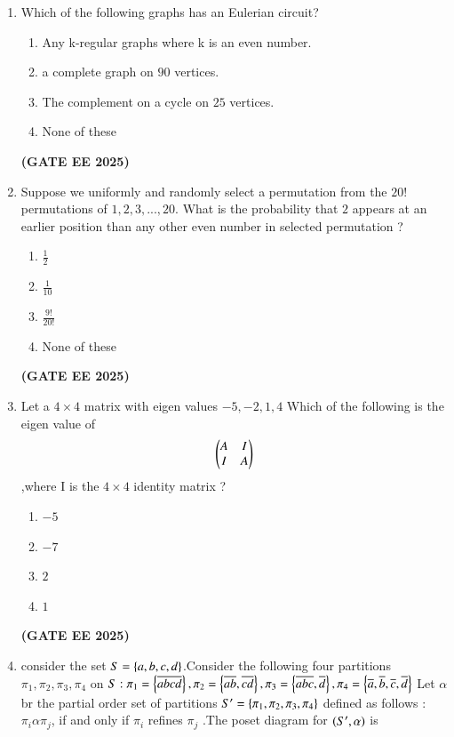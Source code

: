 \documentclass[journal,12pt,onecolumn]{IEEEtran}
\theoremstyle{remark}
\begin{document}
\begin {center}
\begin{enumerate}
\begin{enumerate}
    \end{enumerate}
    \hfill \textbf{(GATE EE 2025)}
    \item Which of the following graphs has an Eulerian circuit?
    \begin{enumerate}
        \item Any k-regular graphs where k is an even number.
        \item a complete graph on $90$ vertices.
        \item The complement on a cycle on $25$ vertices.
        \item None of these
        \end{enumerate}
        \hfill \textbf{(GATE EE 2025)}
\item Suppose we uniformly and randomly select a permutation from the $20!$ permutations of $1,2,3,...,20.$ What is the probability that $2$ appears at an earlier position than any other even number  in selected permutation ?
\begin{enumerate}
    \item $\frac{1}{2}$   

    \item $\frac{1}{10}$

    \item $\frac{9!}{20!}$
  
    \item None of these
\end{enumerate}
\hfill \textbf{(GATE EE 2025)}
\item Let a $4 \times 4$ matrix with eigen values $-5,-2,1,4 $ Which of the following is the eigen value of
\begin{align}
    \begin{pmatrix}A & I\\ I & A\end{pmatrix}
\end{align} 
,where I is the $4 \times 4$ identity matrix ?
\begin{enumerate}
    \item $-5$
    \item $-7$
    \item $2$
    \item $1$
\end{enumerate}
    
    \hfill \textbf{(GATE EE 2025)}
     
    \item consider the set $S=\left\{a,b,c,d\right\}$.Consider the following four partitions $\pi_1,\pi_2,\pi_3,\pi_4$ on $S: \pi_1=\left\{\overline{abcd}\right\},\pi_2=\left\{\overline{ab},\overline{cd}\right\},\pi_3=\left\{\overline{abc},\overline{d}\right\},\pi_4=\left\{\overline{a},\overline{b},\overline{c},\overline{d}\right\}$ Let $\alpha$ br the partial  order set of partitions $S'=\left\{\pi_1,\pi_2,\pi_3,\pi_4\right\}$ defined as follows :$\pi_i \alpha \pi_j$, if and only if $\pi_i$ refines $\pi_j$ .The poset diagram for $\left(S',\alpha\right)$ is
   

\end{enumerate}
\end{center}
\end{document}
